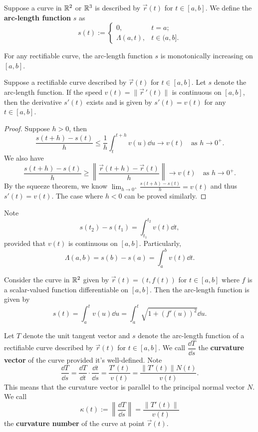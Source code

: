 \documentclass[a4paper]{ctexart}
\begin{document}
    \begin{mydef}
        Suppose a curve in $\mathbb{R}^2$ or $\mathbb{R}^3$ is described by $\vec r(t)$ for $t\in [a,b]$. We define the \textbf{arc-length function} $s$ as
        $$ s(t) := \begin{cases}
            0, & t=a; \\
            \Lambda(a,t), & t\in (a,b].
        \end{cases}
        $$
    \end{mydef}
    \begin{mythm}
        For any rectifiable curve, the arc-length function $s$ is monotonically increasing on $[a,b]$.
    \end{mythm}
    \begin{mythm}
        Suppose a rectifiable curve described by $\vec r(t)$ for $t\in [a,b]$. Let $s$ denote the arc-length function. If the speed $v(t) = \| \vec r\,'(t)\|$ is continuous on $[a,b]$, then the derivative $s'(t)$ exists and is given by $s'(t) = v(t)$ for any $t\in [a,b]$.
    \end{mythm}
    \begin{proof}
        Suppose $h>0$, then
        $$ \frac{s(t+h) - s(t)}{h} \le \frac1h \int_t^{t+h} v(u) \dd u \to v(t) \quad \text{as } h\to 0^+. $$
        We also have
        $$ \frac{s(t+h) - s(t)}{h} \ge \left\|\frac{\vec r(t+h) - \vec r(t)}{h}\right\| \to v(t) \quad \text{as } h\to 0^+. $$
        By the squeeze theorem, we know $\displaystyle \lim_{h\to 0^+} \frac{s(t+h) - s(t)}{h} = v(t)$ and thus $s'(t) = v(t)$. The case where $h<0$ can be proved similarly.
    \end{proof}
    \begin{myrmk}
        Note
        $$ s(t_2) - s(t_1) = \int_{t_1}^{t_2} v(t) \dd t,$$
        provided that $v(t)$ is continuous on $[a,b]$. Particularly, $$\Lambda(a,b) = s(b) - s(a) = \int_a^b v(t) \dd t.$$
    \end{myrmk}
    \begin{myex}
        Consider the curve in $\mathbb{R}^2$ given by $\vec r(t) = (t, f(t))$ for $t\in [a,b]$ where $f$ is a scalar-valued function differentiable on $[a,b]$. Then the arc-length function is given by
        $$ s(t) = \int_a^t v(u) \dd u = \int_a^t \sqrt{1 + (f'(u))^2} \dd u. $$
    \end{myex}
    \begin{mydef}
        Let $T$ denote the unit tangent vector and $s$ denote the arc-length function of a rectifiable curve described by $\vec r(t)$ for $t\in [a,b]$. We call $\dfrac{\dd T}{\dd s}$ the \textbf{curvature vector} of the curve provided it's well-defined. Note
        $$ \frac{\dd T}{\dd s} = \frac{\dd T}{\dd t} \cdot \frac{\dd t}{\dd s} = \frac{T'(t)}{v(t)} = \frac{\left\|T'(t)\right\| N(t)}{v(t)}. $$
        This means that the curvature vector is parallel to the principal normal vector $N$. We call $$\kappa(t) := \left\| \dfrac{\dd T}{\dd s}\right\| = \dfrac{\left\|T'(t)\right\|}{v(t)}$$ the \textbf{curvature number} of the curve at point $\vec r(t)$.
    \end{mydef}
\end{document}
